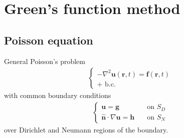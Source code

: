 \documentclass[letterpaper,10pt,english]{jupyterBook}
\begin{document}
\sphinxstepscope




\chapter{Green’s function method}
\label{\detokenize{ch/pde/bem-poisson-helmholtz-waves:green-s-function-method}}\label{\detokenize{ch/pde/bem-poisson-helmholtz-waves:math-green-function}}\label{\detokenize{ch/pde/bem-poisson-helmholtz-waves::doc}}

\section{Poisson equation}
\label{\detokenize{ch/pde/bem-poisson-helmholtz-waves:poisson-equation}}\label{\detokenize{ch/pde/bem-poisson-helmholtz-waves:classical-electromagnetism-green-function-poisson}}
\sphinxAtStartPar
General Poisson’s problem
\begin{equation*}
\begin{split}\begin{cases}
  - \nabla^2 \mathbf{u}(\mathbf{r}, t) = \mathbf{f}(\mathbf{r},t) \\
  \text{+ b.c.}
\end{cases}\end{split}
\end{equation*}
\sphinxAtStartPar
with common boundary conditions
\begin{equation*}
\begin{split}\begin{cases}
\mathbf{u} = \mathbf{g} & \quad \text{on $S_D$} \\
\hat{\mathbf{n}} \cdot \nabla \mathbf{u} = \mathbf{h} & \quad \text{on $S_N$}
\end{cases}\end{split}
\end{equation*}
\sphinxAtStartPar
over Dirichlet and Neumann regions of the boundary.
\end{document}
